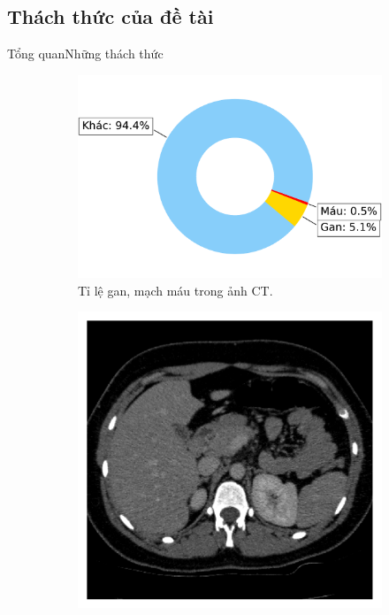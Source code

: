 \documentclass[
	10pt,                %
	aspectratio=169,     %
]{beamer}
\begin{document}
\subsection[Thách thức]{Thách thức của đề tài}
	\begin{frame}{Tổng quan}{Những thách thức}
		\vspace{1mm}
		\begin{figure}[h!]
			\begin{subfigure}[b]{0.45\textwidth}
				\includegraphics[height=.35\textheight]{Presentation_template/figures/liver-vessel-bg-ratio.pdf}
				\caption{Tỉ lệ gan, mạch máu trong ảnh CT.}
			\end{subfigure}
			\begin{subfigure}[b]{0.45\textwidth}
			\centering
				\includegraphics[height=.35\textheight]{Presentation_template/figures/ct-low-constrast.pdf}

\end{subfigure}
\end{figure}
\end{frame}
\end{document}
